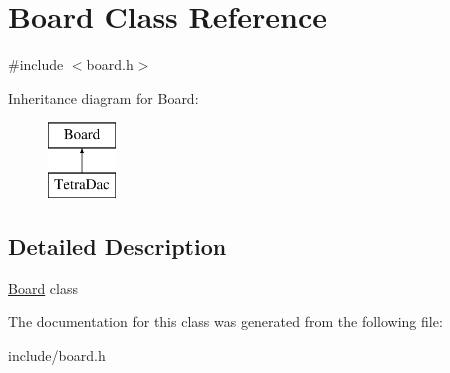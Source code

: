 \hypertarget{classBoard}{}\section{Board Class Reference}
\label{classBoard}


{\ttfamily \#include $<$board.\+h$>$}

Inheritance diagram for Board\+:\begin{figure}[H]
\begin{center}
\leavevmode
\includegraphics[height=2.000000cm]{classBoard}
\end{center}
\end{figure}


\subsection{Detailed Description}
\mbox{\hyperlink{classBoard}{Board}} class 

The documentation for this class was generated from the following file\+:\begin{DoxyCompactItemize}
\item 
include/board.\+h\end{DoxyCompactItemize}
